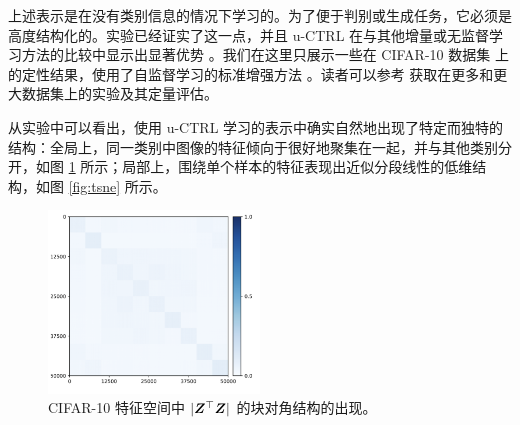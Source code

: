 \documentclass[../../book-main.tex]{subfiles}
\begin{document}
上述表示是在没有类别信息的情况下学习的。为了便于判别或生成任务，它必须是高度结构化的。实验已经证实了这一点，并且 u-CTRL 在与其他增量或无监督学习方法的比较中显示出显著优势 \cite{pmlr-v234-tong24a}。我们在这里只展示一些在 CIFAR-10 数据集 \cite{krizhevsky2014cifar} 上的定性结果，使用了自监督学习的标准增强方法 \cite{chen2020simple}。读者可以参考 \cite{pmlr-v234-tong24a} 获取在更多和更大数据集上的实验及其定量评估。

从实验中可以看出，使用 u-CTRL 学习的表示中确实自然地出现了特定而独特的结构：全局上，同一类别中图像的特征倾向于很好地聚集在一起，并与其他类别分开，如图 \ref{fig:heatmap_z} 所示；局部上，围绕单个样本的特征表现出近似分段线性的低维结构，如图 \ref{fig:tsne} 所示。

\begin{figure}[t]
     \footnotesize
     \centering
    \includegraphics[width=0.5\textwidth]{figs_chap6/CIFAR10_cifar10_heatmap_zz.png}
    \caption{\small CIFAR-10 特征空间中 $|\bm{Z}^\top \bm{Z}|$ 的块对角结构的出现。}
    \label{fig:heatmap_z}
\end{figure}
\end{document}
